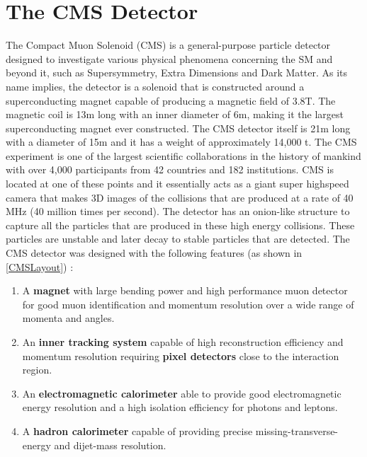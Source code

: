 \chapter{The CMS Detector\label{ch:CMS}}

The Compact Muon Solenoid (CMS) is a general-purpose particle detector designed to investigate various physical phenomena concerning the SM and beyond it, such as Supersymmetry,
Extra Dimensions and Dark Matter. As its name implies, the detector is a solenoid that is constructed around a superconducting magnet capable of producing a magnetic field of 3.8\unit{\tesla}. The magnetic coil is 13m long with an inner diameter of 6\unit{\meter}, making it the largest superconducting magnet ever constructed. The CMS detector itself is 21m long with a diameter of 15m and it has a weight of approximately 14,000 \unit{\tonne}.
The CMS experiment is one of the largest scientific collaborations in the history of mankind with over 4,000 participants from 42 countries and 182 institutions. CMS is located at one of these points and it essentially acts as a giant super highspeed camera that makes 3D images of the collisions that are produced at a rate of 40 MHz (40 million times per second). The detector has an onion-like structure to capture all the particles that are produced in these high energy collisions. These particles are unstable and later decay to stable particles that are detected.  The CMS detector was designed with the following features (as shown in \autoref{CMSLayout}) :

\begin{enumerate}
	\item{A \textbf{magnet} with large bending power and high performance muon detector for good muon
	      identification and momentum resolution over a wide range of momenta and angles.}

	\item{An \textbf{inner tracking system} capable of high reconstruction efficiency and momentum resolution
	      requiring \textbf{pixel detectors} close to the interaction region.}

	\item{An \textbf{electromagnetic calorimeter} able to provide good electromagnetic energy resolution and
	      a high isolation efficiency for photons and leptons.}

	\item{A \textbf{hadron calorimeter} capable of providing precise missing-transverse-energy and dijet-mass
	      resolution.}

\end{enumerate}

